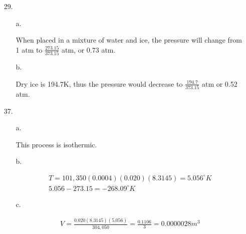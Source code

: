 \documentclass[12pt, letterpaper]{article}
\begin{document}
    \begin{enumerate}
        \item [29.]
        
        \begin{itemize}
            \item [a.] \mbox{}
            \begin{mdframed}
                When placed in a mixture of water and ice, the pressure will change from 1 atm to $\frac{273.15}{373.15}$ atm, or 0.73 atm.
            \end{mdframed}
            
            \item[b.] \mbox{}
            \begin{mdframed}
                Dry ice is 194.7K, thus the pressure would decrease to $\frac{194.7}{373.15}$ atm or 0.52 atm.
            \end{mdframed}
        \end{itemize}

        \item [37.]
        
        \begin{itemize}
            \item [a.] \mbox{}
            \begin{mdframed}
                This process is isothermic.
            \end{mdframed}

            \item [b.] \mbox{}
            \begin{mdframed}
                \begin{equation*}
                    \begin{gathered}
                        T = 101,350(0.0004)(0.020)(8.3145) = 5.056^{\circ}K     \\
                        5.056 - 273.15 = \boxed{-268.09^{\circ}K}
                    \end{gathered}
                \end{equation*}
            \end{mdframed}

            \item [c.] \mbox{}
            \begin{mdframed}
                \begin{equation*}
                    \begin{gathered}
                        V = \frac{0.020(8.3145)(5.056)}{304,050} = \frac{0.1106}{3} = \boxed{0.0000028m^{3}}
                    \end{gathered}
                \end{equation*}
            \end{mdframed}
        \end{itemize}


\end{enumerate}
\end{document}

